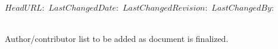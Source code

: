\svnidlong
{$HeadURL: $}
{$LastChangedDate: $}
{$LastChangedRevision: $}
{$LastChangedBy: $}


\thispagestyle{empty}%
\vspace*{\fill}
\begin{fullwidth}
\sffamily
{
  \huge
  \smallcaps
  \@title
}\\
\vspace{4\baselineskip}
{\Large 
\noindent
% 
Author/contributor list to be added as document is finalized.
}\\
\vspace{4\baselineskip}
\noindent
\@date\\
\vspace{\baselineskip}
\end{fullwidth}
\vspace*{\fill}
